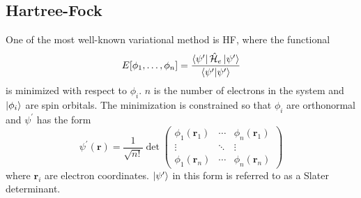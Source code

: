 \documentclass[final,3p,times,twocolumn]{elsarticle}
\newcommand{\ham}{\hat{\mathcal{H}}}
\begin{document}

\subsection{Hartree-Fock} \label{sec:hf}
One of the most well-known variational method is HF,\cite{hartree,fock,roothaan} %
where the functional
\begin{equation} \label{eq:hffunc}
E[\phi_1, \ldots, \phi_n] = \dfrac{\bra{\psi^\prime}\ham_e\ket{\psi^\prime}}{\bra{\psi^\prime}\ket{\psi^\prime}}
\end{equation}
is minimized with respect to $\phi_i$. $n$ is the number of electrons in the system and $\ket{\phi_i}$ are spin orbitals. The minimization is constrained so that $\phi_i$ are orthonormal and $\psi^\prime$ has the form
\begin{equation} \label{eq:det}
\psi^\prime(\mathbf{r}) = \dfrac{1}{\sqrt{n!}}\det\begin{pmatrix} \phi_1(\mathbf{r}_1) & \cdots & \phi_n(\mathbf{r}_1) \\ \vdots & \ddots & \vdots \\
\phi_1(\mathbf{r}_n) & \cdots & \phi_n(\mathbf{r}_n) \end{pmatrix}
\end{equation}
where $\mathbf r_i$ are electron coordinates. $\ket{\psi^\prime}$ in this form is referred to as a Slater determinant.\cite{slater} %
\end{document}
